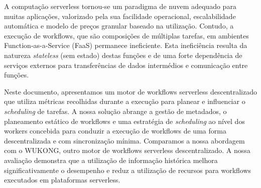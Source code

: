 \acresetall
\noindent A computação serverless tornou-se um paradigma de nuvem adequado para muitas aplicações, valorizado pela sua facilidade operacional, escalabilidade automática e modelo de preços granular baseado na utilização. Contudo, a execução de workflows, que são composições de múltiplas tarefas, em ambientes Function-as-a-Service (FaaS) permanece ineficiente. Esta ineficiência resulta da natureza \textit{stateless} (sem estado) destas funções e de uma forte dependência de serviços externos para transferências de dados intermédios e comunicação entre funções.

Neste documento, apresentamos um motor de workflows serverless descentralizado que utiliza métricas recolhidas durante a execução para planear e influenciar o \textit{scheduling} de tarefas. A nossa solução abrange a gestão de metadados, o planeamento estático de workflows e uma estratégia de \textit{scheduling} ao nível dos workers concebida para conduzir a execução de workflows de uma forma descentralizada e com sincronização mínima. Comparamos a nossa abordagem com o WUKONG, outro motor de workflows serverless descentralizado. A nossa avaliação demonstra que a utilização de informação histórica melhora significativamente o desempenho e reduz a utilização de recursos para workflows executados em plataformas serverless.